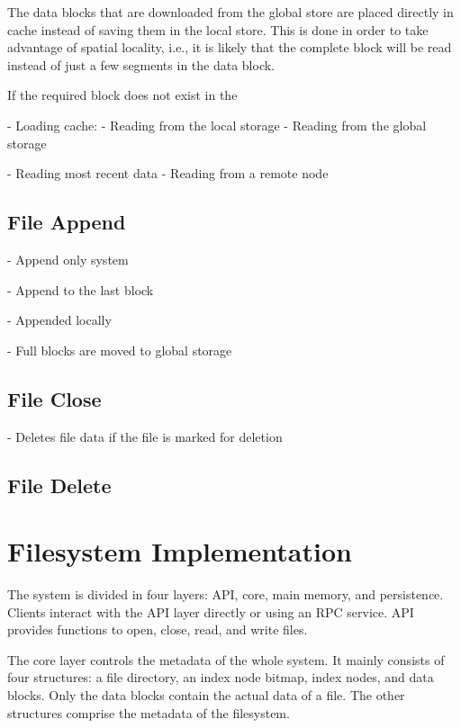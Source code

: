 \documentclass[]{article}
\begin{document}
{The data blocks that are downloaded from the global store are placed directly
in cache instead of saving them in the local store. This is done in order
to take advantage of spatial locality, i.e., it is likely that the complete
block will be read instead of just a few segments in the data block.

If the required block does not exist in the 



- Loading cache:
  - Reading from the local storage
  - Reading from the global storage


- Reading most recent data
	- Reading from a remote node


\subsection{File Append}

- Append only system

- Append to the last block

- Appended locally

- Full blocks are moved to global storage

\subsection{File Close}

- Deletes file data if the file is marked for deletion


\subsection{File Delete}




\section{Filesystem Implementation}

The system is divided in four layers: API, core, main memory, and persistence.
Clients interact with the API layer directly or using an RPC service.  API
provides functions to open, close, read, and write files.


The core layer controls the metadata of the whole system. It mainly consists of
four structures: a file directory, an index node bitmap, index nodes, and data
blocks. Only the data blocks contain the actual data of a file. The other
structures comprise the metadata of the filesystem.


}
\end{document}
